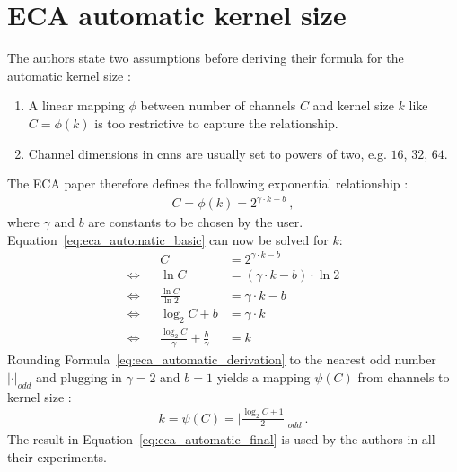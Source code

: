 \section{ECA automatic kernel size}\label{app:eca_automatic_formula}
The authors state two assumptions before deriving their formula for the automatic kernel size \cite{wangECANetEfficientChannel2020}:
\begin{enumerate}
    \item A linear mapping $\phi$ between number of channels $C$ and kernel size $k$ like $C = \phi (k)$ is too restrictive to capture the relationship.
    \item Channel dimensions in \glspl{cnn} are usually set to powers of two, e.g. $16$, $32$, $64$.
\end{enumerate}
The ECA paper therefore defines the following exponential relationship \cite{wangECANetEfficientChannel2020}:
\begin{gather}\label{eq:eca_automatic_basic}
    C = \phi (k) = 2^{\gamma \cdot k - b}~,
\end{gather}
where $\gamma$ and $b$ are constants to be chosen by the user.\\
Equation~\ref{eq:eca_automatic_basic} can now be solved for $k$:
\begin{align}\label{eq:eca_automatic_derivation}
&& C & = 2^{\gamma \cdot k-b} \nonumber \\
\Leftrightarrow && \ln C & = (\gamma \cdot k-b) \cdot \ln 2 \nonumber \\
\Leftrightarrow && \frac{\ln C}{\ln 2} & = \gamma \cdot k-b \nonumber \\
\Leftrightarrow && \log_2 C + b & = \gamma \cdot k \nonumber \\
\Leftrightarrow && \frac{ \log_2 C}{ \gamma} + \frac{b}{\gamma} & = k
\end{align}
Rounding Formula~\ref{eq:eca_automatic_derivation} to the nearest odd number $| \cdot |_{odd}$ and plugging in $\gamma = 2$ and $b=1$ yields a mapping $\psi (C)$ from channels to kernel size \cite{wangECANetEfficientChannel2020}:
\begin{gather}\label{eq:eca_automatic_final}
    k = \psi(C) = \bigg| \frac{ \log_2 C + 1}{2}  \bigg|_{odd}~.
\end{gather}
The result in Equation~\ref{eq:eca_automatic_final} is used by the authors in all their experiments.

